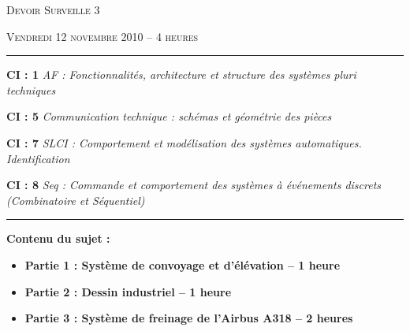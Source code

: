 \documentclass[10pt,oneside]{article}
\begin{document}
\pagestyle{fancy}
\renewcommand{\headrulewidth}{0.2pt}

\fancyhead{}


\renewcommand{\footrulewidth}{0.2pt}
\fancyfoot[C]{\bfseries \thepage}




\vspace{1cm}

\begin{center}
 \huge\textsc{Devoir Surveille 3}

\vspace{1cm}

 \large\textsc{Vendredi 12 novembre 2010 -- 4 heures}
\end{center}

\vspace{1cm}


\noindent\rule{\linewidth}{.2pt}
\begin{center}
 \large\textbf{CI : 1} \textit{AF : Fonctionnalités, architecture et structure des systèmes pluri techniques}

 \large\textbf{CI : 5} \textit{Communication technique : schémas et géométrie des pièces}

 \large\textbf{CI : 7} \textit{SLCI : Comportement et modélisation des systèmes automatiques. Identification }

 \large\textbf{CI : 8} \textit{Seq : Commande et comportement des systèmes à événements discrets (Combinatoire et Séquentiel)}
\end{center}
\noindent\rule{\linewidth}{.2pt}


\vfill

\textbf{Contenu du sujet :}
\begin{itemize}
\item \textbf{Partie 1 : Système de convoyage et d'élévation -- 1 heure }
\item \textbf{Partie 2 : Dessin industriel -- 1 heure }
\item \textbf{Partie 3 : Système de freinage de l'Airbus A318 -- 2 heures}
\end{itemize}
\end{document}

